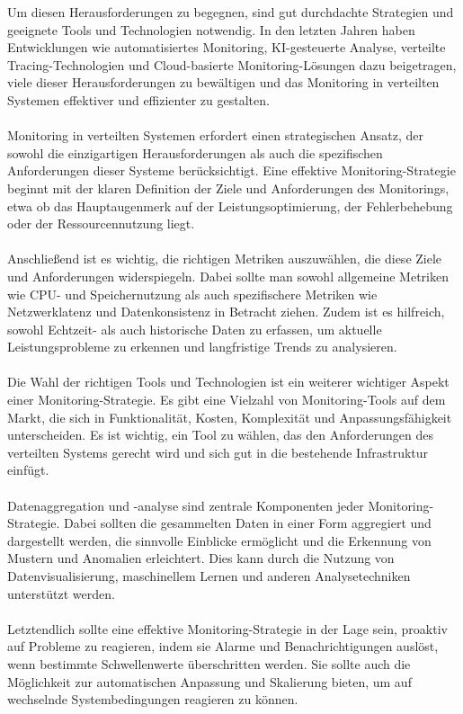 Um diesen Herausforderungen zu begegnen, sind gut durchdachte Strategien und geeignete Tools und Technologien notwendig. In den letzten Jahren haben Entwicklungen wie automatisiertes Monitoring, KI-gesteuerte Analyse, verteilte Tracing-Technologien und Cloud-basierte Monitoring-Lösungen dazu beigetragen, viele dieser Herausforderungen zu bewältigen und das Monitoring in verteilten Systemen effektiver und effizienter zu gestalten.
\\\\
Monitoring in verteilten Systemen erfordert einen strategischen Ansatz, der sowohl die einzigartigen Herausforderungen als auch die spezifischen Anforderungen dieser Systeme berücksichtigt. Eine effektive Monitoring-Strategie beginnt mit der klaren Definition der Ziele und Anforderungen des Monitorings, etwa ob das Hauptaugenmerk auf der Leistungsoptimierung, der Fehlerbehebung oder der Ressourcennutzung liegt.
\\\\
Anschließend ist es wichtig, die richtigen Metriken auszuwählen, die diese Ziele und Anforderungen widerspiegeln. Dabei sollte man sowohl allgemeine Metriken wie CPU- und Speichernutzung als auch spezifischere Metriken wie Netzwerklatenz und Datenkonsistenz in Betracht ziehen. Zudem ist es hilfreich, sowohl Echtzeit- als auch historische Daten zu erfassen, um aktuelle Leistungsprobleme zu erkennen und langfristige Trends zu analysieren.
\\\\
Die Wahl der richtigen Tools und Technologien ist ein weiterer wichtiger Aspekt einer Monitoring-Strategie. Es gibt eine Vielzahl von Monitoring-Tools auf dem Markt, die sich in Funktionalität, Kosten, Komplexität und Anpassungsfähigkeit unterscheiden. Es ist wichtig, ein Tool zu wählen, das den Anforderungen des verteilten Systems gerecht wird und sich gut in die bestehende Infrastruktur einfügt.
\\\\
Datenaggregation und -analyse sind zentrale Komponenten jeder Monitoring-Strategie. Dabei sollten die gesammelten Daten in einer Form aggregiert und dargestellt werden, die sinnvolle Einblicke ermöglicht und die Erkennung von Mustern und Anomalien erleichtert. Dies kann durch die Nutzung von Datenvisualisierung, maschinellem Lernen und anderen Analysetechniken unterstützt werden.
\\\\
Letztendlich sollte eine effektive Monitoring-Strategie in der Lage sein, proaktiv auf Probleme zu reagieren, indem sie Alarme und Benachrichtigungen auslöst, wenn bestimmte Schwellenwerte überschritten werden. Sie sollte auch die Möglichkeit zur automatischen Anpassung und Skalierung bieten, um auf wechselnde Systembedingungen reagieren zu können.
